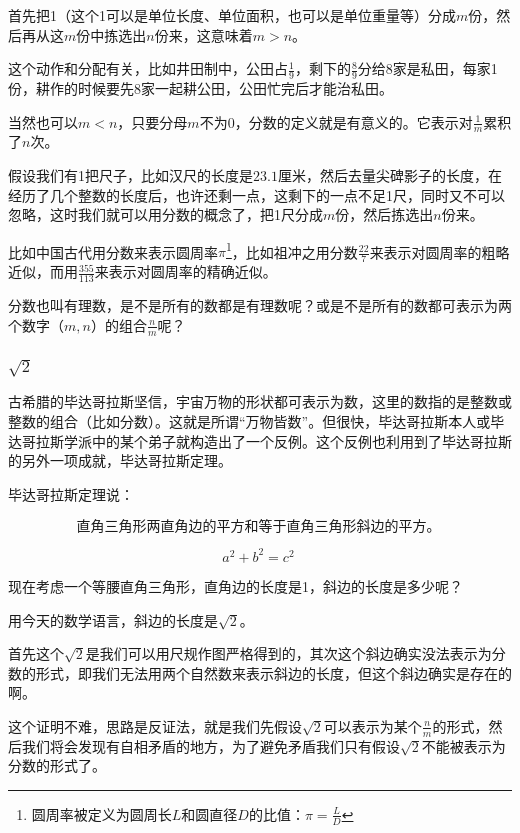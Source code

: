 首先把1（这个1可以是单位长度、单位面积，也可以是单位重量等）分成$m$份，然后再从这$m$份中拣选出$n$份来，这意味着$m > n$。

这个动作和分配有关，比如井田制中，公田占$\frac{1}{9}$，剩下的$\frac{8}{9}$分给8家是私田，每家1份，耕作的时候要先8家一起耕公田，公田忙完后才能治私田。

当然也可以$m < n$，只要分母$m$不为0，分数的定义就是有意义的。它表示对$\frac{1}{m}$累积了$n$次。

假设我们有1把尺子，比如汉尺的长度是$23.1$厘米，然后去量尖碑影子的长度，在经历了几个整数的长度后，也许还剩一点，这剩下的一点不足1尺，同时又不可以忽略，这时我们就可以用分数的概念了，把1尺分成$m$份，然后拣选出$n$份来。

比如中国古代用分数来表示圆周率$\pi$\footnote{圆周率被定义为圆周长$L$和圆直径$D$的比值：$\pi = \frac{L}{D}$}，比如祖冲之用分数$\frac{22}{7}$来表示对圆周率的粗略近似，而用$\frac{355}{113}$来表示对圆周率的精确近似。

分数也叫有理数，是不是所有的数都是有理数呢？或是不是所有的数都可表示为两个数字（$m,n$）的组合$\frac{n}{m}$呢？

\subsubsection{$\sqrt{2}$}


古希腊的毕达哥拉斯坚信，宇宙万物的形状都可表示为数，这里的数指的是整数或整数的组合（比如分数）。这就是所谓“万物皆数”。但很快，毕达哥拉斯本人或毕达哥拉斯学派中的某个弟子就构造出了一个反例。这个反例也利用到了毕达哥拉斯的另外一项成就，毕达哥拉斯定理。

毕达哥拉斯定理说：

\begin{equation}
\text{直角三角形两直角边的平方和等于直角三角形斜边的平方。}~
\end{equation}

\begin{equation}
a^2 + b^2 = c^2~
\end{equation}

现在考虑一个等腰直角三角形，直角边的长度是1，斜边的长度是多少呢？

用今天的数学语言，斜边的长度是$\sqrt{2}$。

首先这个$\sqrt{2}$是我们可以用尺规作图严格得到的，其次这个斜边确实没法表示为分数的形式，即我们无法用两个自然数来表示斜边的长度，但这个斜边确实是存在的啊。

这个证明不难，思路是反证法，就是我们先假设$\sqrt{2}$可以表示为某个$\frac{n}{m}$的形式，然后我们将会发现有自相矛盾的地方，为了避免矛盾我们只有假设$\sqrt{2}$不能被表示为分数的形式了。


